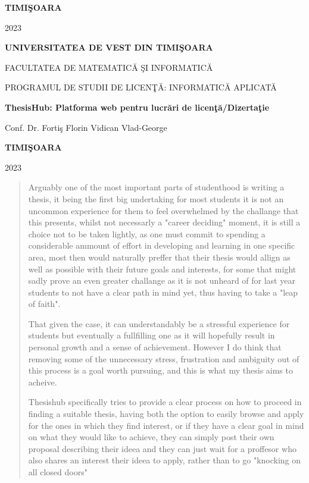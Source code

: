 \documentclass[12pt,a4paper,hidelinks]{report}
\theoremstyle{definition}
\theoremstyle{remark}
\begin{document}
\vfill
\begin{center}
{\bf TIMI\c SOARA

2023}
\end{center}
\newpage
\thispagestyle{empty}
\begin{center}

{\large{\bf UNIVERSITATEA DE VEST DIN TIMI\c SOARA

FACULTATEA DE MATEMATIC\u A \c SI INFORMATIC\u A

PROGRAMUL DE STUDII DE LICEN\c T\u A: INFORMATIC\u A APLICAT\u A}}

\vspace{120pt}
{\huge {\bf ThesisHub: Platforma web pentru lucr\u ari de licen\c t\u a/Dizerta\c tie}}

\vspace{150pt}
\end{center}

{\large{}

\noindent Conf. Dr. Forti\c s Florin \hfill Vidican Vlad-George}

\vfill
\begin{center}
{\bf TIMI\c SOARA

2023}
\end{center}
\newpage
\normalsize{}
\begin{abstract}
    Arguably one of the most important parts of studenthood is writing a thesis,
it being the first big undertaking for most students it is not an uncommon experience for them to feel overwhelmed
by the challange that this presents, whilst not necessarly a "career deciding" moment, it is still a choice not to be taken lightly,
as one must commit to spending a considerable ammount of effort in developing and learning in one specific area, most 
then would naturally preffer that their thesis would allign as well as possible with their future goals and interests, for some that might sadly prove an even greater challange
as it is not unheard of for last year students to not have a clear path in mind yet, thus having to take a "leap of faith".

That given the case, it can understandably be a stressful experience for students but eventually a fullfilling one as it will hopefully result in personal growth and a sense of achievement. However
I do think that removing some of the unnecessary stress, frustration and ambiguity out of this process is a goal worth pursuing, and this is what my thesis aims to acheive.

Thesishub specifically tries to provide a clear process on how to proceed in finding a suitable thesis, having both the option to easily browse and apply for the ones
in which they find interest, or if they have a clear goal in mind on what they would like to achieve, they can simply post their own proposal 
describing their ideea and they can just wait for a proffesor who also shares an interest their ideea to apply, rather than to 
go "knocking on all closed doors"
\end{abstract}
\end{document}
